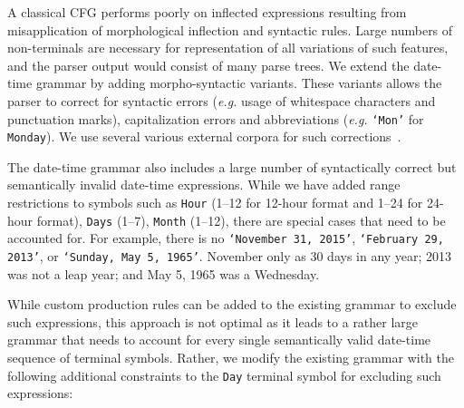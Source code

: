 A classical CFG performs poorly on inflected expressions resulting from misapplication of morphological inflection and syntactic rules. Large numbers of non-terminals are necessary for representation of all variations of such features, and the parser output would consist of many parse trees. We extend the date-time grammar by adding morpho-syntactic variants. These variants allows the parser to correct for syntactic errors (\textit{e.g.} usage of whitespace characters and punctuation marks), capitalization errors and abbreviations (\textit{e.g.} \texttt{`Mon'} for \texttt{Monday}). We use several various external corpora for such corrections~\cite{nltkcorpora}.

The date-time grammar also includes a large number of syntactically correct but semantically invalid date-time expressions. While we have added range restrictions to symbols such as \texttt{Hour} (1--12 for 12-hour format and 1--24 for 24-hour format), \texttt{Days} (1--7), \texttt{Month} (1--12), there are special cases that need to be accounted for. For example, there is no  \texttt{`November 31, 2015'}, \texttt{`February 29, 2013'}, or \texttt{`Sunday, May  5, 1965'}. November only as 30 days in any year; 2013 was not a leap year; and May 5, 1965 was a Wednesday.

While custom production rules can be added to the existing grammar to exclude such expressions, this approach is not optimal as it leads to a rather large grammar that needs to account for every single semantically valid date-time sequence of terminal symbols. Rather, we modify the existing grammar with the following additional constraints to the \texttt{Day} terminal symbol for excluding such expressions:

